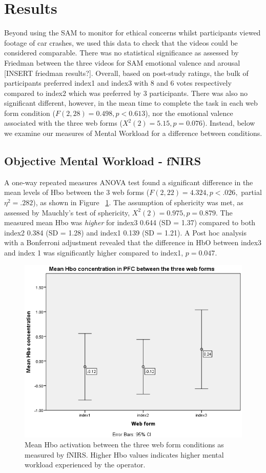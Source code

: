 \documentclass[../main/Feedback.tex]{subfiles}
\begin{document}
\section{Results}

Beyond using the SAM to monitor for ethical concerns whilst participants viewed footage of car crashes, we used this data to check that the videos could be considered comparable. 
There was no statistical significance as assessed by Friedman between the three videos for SAM emotional valence and arousal [INSERT friedman results?].
Overall, based on post-study ratings, the bulk of participants preferred index1 and index3 with 8 and 6 votes respectively compared to index2 which was preferred by 3 participants. 
There was also no significant different, however, in the mean time to complete the task in each web form condition ($F(2,28)=0.498, p<0.613$), nor the emotional valence associated with the three web forms ($X^{2}(2)=5.15,p=0.076$). 
Instead, below we examine our measures of Mental Workload for a difference between conditions.

\subsection{Objective Mental Workload - fNIRS}
A one-way repeated measures ANOVA test found a significant difference in the mean levels of Hbo between the 3 web forms ($F(2,22)=4.324, p<.026,$ partial $\eta^{2}=.282$), as shown in Figure ~\ref{fig:mean-hbo-index123}. 
The assumption of sphericity was met, as assessed by Mauchly's test of sphericity, $X^{2}(2) = 0.975, p = 0.879$. 
The measured mean Hbo was \textit{higher} for index3 0.644 (SD = 1.37) compared to both index2 0.384 (SD = 1.28) and index1 0.139 (SD = 1.21). 
A Post hoc analysis with a Bonferroni adjustment revealed that the difference in HbO between index3 and index 1 was significantly higher compared to index1, $p=0.047$.

\begin{figure}[h]
	\centering
	\includegraphics[width=0.7\linewidth]{../figures/mean-hbo-index123}
	\caption[mean Hbo activation between the three web forms]{Mean Hbo activation between the three web form conditions as measured by fNIRS. Higher Hbo values indicates higher mental workload experienced by the operator.}
	\label{fig:mean-hbo-index123}
\end{figure}
		
\end{document}

